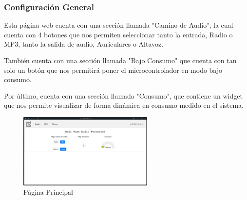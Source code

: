 \subsubsection{Configuración General}
Esta página web cuenta con una sección llamada "Camino de Audio", la cual cuenta con 4 botones que nos permiten seleccionar tanto la entrada, Radio o MP3, tanto la salida de audio, Auriculares o Altavoz.

También cuenta con una sección llamada "Bajo Consumo" que cuenta con tan solo un botón que nos permitirá poner el microcontrolador en modo bajo consumo.

Por último, cuenta con una sección llamada "Consumo", que contiene un widget que nos permite visualizar de forma dinámica en consumo medido en el sistema.

\begin{figure}[h]
    \centering
    \includegraphics[width=0.6\textwidth]{images/3/3-1/3-1-1-1/Pagina_Principal.png}
    \caption{Página Principal}
    \label{fig:3-1-1-1-Principal}
\end{figure}